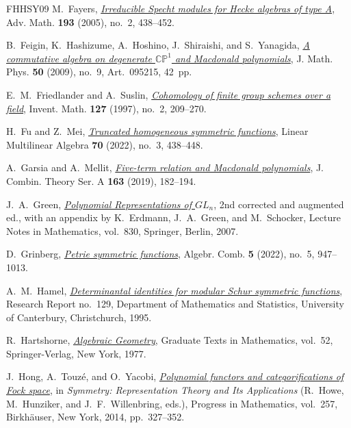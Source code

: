 \documentclass[12pt,reqno,a4paper]{amsart}
\numberwithin{equation}{section}
\numberwithin{figure}{section}
\theoremstyle{plain}
\theoremstyle{definition}
\begin{document}
\begin{thebibliography}{FHHSY09}
M.~Fayers,
\emph{\href{https://doi.org/10.1016/j.aim.2004.06.001}{Irreducible Specht modules for Hecke algebras of type A}},
Adv. Math. \textbf{193} (2005), no.~2, 438--452.

B.~Feigin, K.~Hashizume, A.~Hoshino, J.~Shiraishi, and S.~Yanagida,
\emph{\href{https://doi.org/10.1063/1.3192773}{A commutative algebra on degenerate $\mathbb{CP}^1$ and Macdonald
polynomials}}, J. Math. Phys. \textbf{50} (2009), no.~9, Art.~095215, 42~pp.

E.~M.~Friedlander and A.~Suslin,
\emph{\href{https://doi.org/10.1007/s002220050119}{Cohomology of finite group schemes over a field}},
Invent. Math. \textbf{127} (1997), no.~2, 209--270.

H.~Fu and Z.~Mei,
\emph{\href{https://doi.org/10.1080/03081087.2020.1733460}{Truncated homogeneous symmetric functions}},
Linear Multilinear Algebra \textbf{70} (2022), no.~3, 438--448.

A.~Garsia and A.~Mellit,
\emph{\href{https://doi.org/10.1016/j.jcta.2018.12.003}{Five-term relation and Macdonald polynomials}},
J. Combin. Theory Ser. A \textbf{163} (2019), 182--194.

J.~A.~Green,
\emph{\href{https://doi.org/10.1007/3-540-46944-3}{Polynomial Representations of $GL_n$}},
2nd corrected and augmented ed., with an appendix by
K.~Erdmann, J.~A.~Green, and M.~Schocker, Lecture Notes in Mathematics, vol.~830, Springer, Berlin, 2007.

D.~Grinberg,
\emph{\href{https://doi.org/10.5802/alco.232}{Petrie symmetric functions}},
Algebr. Comb. \textbf{5} (2022), no.~5, 947--1013.

A.~M.~Hamel,
\emph{\href{https://hdl.handle.net/10092/11281}{Determinantal identities
for modular Schur symmetric functions}},
Research Report no.~129, Department of Mathematics and Statistics,
University of Canterbury, Christchurch, 1995.

R.~Hartshorne,
\emph{\href{https://doi.org/10.1007/978-1-4757-3849-0}{Algebraic Geometry}},
Graduate Texts in Mathematics, vol.~52, Springer-Verlag, New York, 1977.

J.~Hong, A.~Touz\'e, and O.~Yacobi,
\emph{\href{https://doi.org/10.1007/978-1-4939-1590-3_12}{Polynomial functors and categorifications of Fock space}},
in \emph{Symmetry: Representation Theory and Its Applications}
(R.~Howe, M.~Hunziker, and J.~F.~Willenbring, eds.),
Progress in Mathematics, vol.~257, Birkh\"auser, New York, 2014,
pp.~327--352.


\end{thebibliography}
\end{document}

